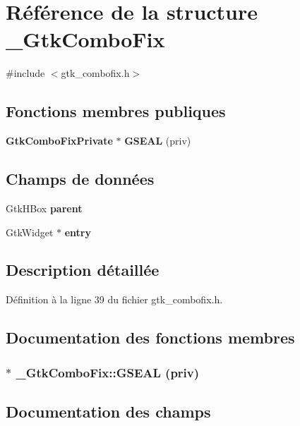\section{Référence de la structure \_\-GtkComboFix}
\label{struct__GtkComboFix}


{\ttfamily \#include $<$gtk\_\-combofix.h$>$}

\subsection*{Fonctions membres publiques}
\begin{DoxyCompactItemize}
\item 
{\bf GtkComboFixPrivate} $\ast$ {\bf GSEAL} (priv)
\end{DoxyCompactItemize}
\subsection*{Champs de données}
\begin{DoxyCompactItemize}
\item 
GtkHBox {\bf parent}
\item 
GtkWidget $\ast$ {\bf entry}
\end{DoxyCompactItemize}


\subsection{Description détaillée}


Définition à la ligne 39 du fichier gtk\_\-combofix.h.



\subsection{Documentation des fonctions membres}
\subsubsection[{GSEAL}]{$\ast$ \_\-GtkComboFix::GSEAL (priv)}\label{struct__GtkComboFix_a625dae9c30ca185a3a87437fd874b63d}


\subsection{Documentation des champs}
